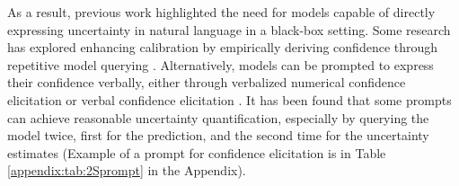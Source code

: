 
As a result, previous work highlighted the need for models capable of directly expressing uncertainty in natural language in a black-box setting. Some research has explored enhancing calibration by empirically deriving confidence through repetitive model querying \citep{Strenght_In_Numbers_Elicitation}. Alternatively, models can be prompted to express their confidence verbally, either through verbalized numerical confidence elicitation \citep{Confidence_Elicitation} or verbal confidence elicitation \citep{Epistetic_Uncertenty}. It has been found that some prompts can achieve reasonable uncertainty quantification, especially by querying the model twice, first for the prediction, and the second time for the uncertainty estimates \citep{Just_Ask_For_Calibration} (Example of a prompt for confidence elicitation is in Table \ref{appendix:tab:2Sprompt} in the Appendix).

 

